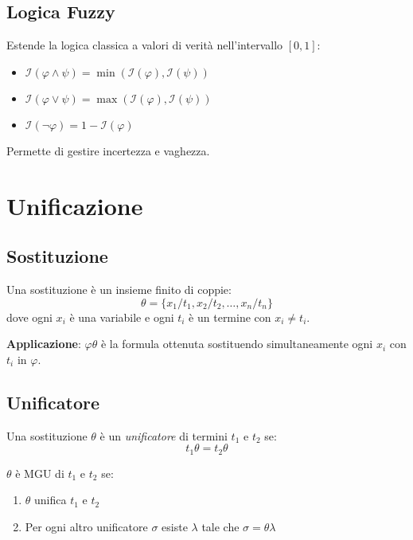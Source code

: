 \subsection{Logica Fuzzy}

Estende la logica classica a valori di verità nell'intervallo $[0, 1]$:
\begin{itemize}
\item $\mathcal{I}(\varphi \land \psi) = \min(\mathcal{I}(\varphi), \mathcal{I}(\psi))$
\item $\mathcal{I}(\varphi \lor \psi) = \max(\mathcal{I}(\varphi), \mathcal{I}(\psi))$
\item $\mathcal{I}(\neg \varphi) = 1 - \mathcal{I}(\varphi)$
\end{itemize}

Permette di gestire incertezza e vaghezza.

\section{Unificazione}

\subsection{Sostituzione}

\begin{definizione}[Sostituzione]
Una sostituzione è un insieme finito di coppie:
\begin{equation}
\theta = \{x_1 / t_1, x_2 / t_2, \ldots, x_n / t_n\}
\end{equation}
dove ogni $x_i$ è una variabile e ogni $t_i$ è un termine con $x_i \neq t_i$.
\end{definizione}

\textbf{Applicazione}: $\varphi\theta$ è la formula ottenuta sostituendo simultaneamente ogni $x_i$ con $t_i$ in $\varphi$.

\subsection{Unificatore}

\begin{definizione}[Unificatore]
Una sostituzione $\theta$ è un \textit{unificatore} di termini $t_1$ e $t_2$ se:
\begin{equation}
t_1\theta = t_2\theta
\end{equation}
\end{definizione}

\begin{definizione}
$\theta$ è MGU di $t_1$ e $t_2$ se:
\begin{enumerate}
\item $\theta$ unifica $t_1$ e $t_2$
\item Per ogni altro unificatore $\sigma$ esiste $\lambda$ tale che $\sigma = \theta\lambda$
\end{enumerate}
\end{definizione}

